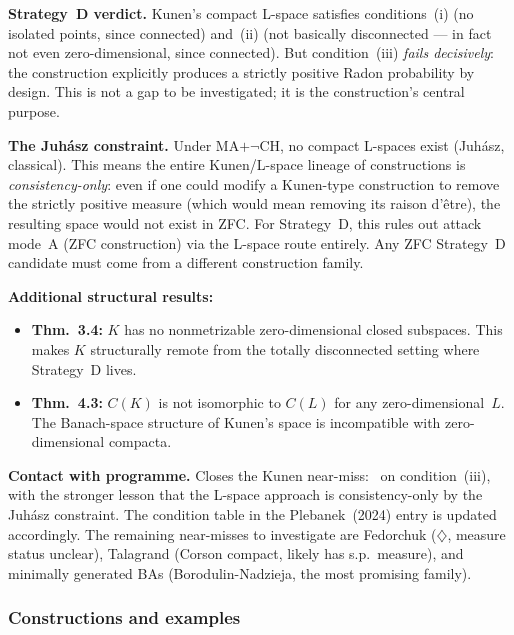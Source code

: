 \medskip\noindent
\textbf{Strategy~D verdict.}  Kunen's compact L-space satisfies
conditions~(i) (no isolated points, since connected) and~(ii) (not
basically disconnected --- in fact not even zero-dimensional, since
connected).  But condition~(iii) \emph{fails decisively}: the
construction explicitly produces a strictly positive Radon probability
by design.  This is not a gap to be investigated; it is the
construction's central purpose.

\medskip\noindent
\textbf{The Juh\'{a}sz constraint.}  Under MA$+\neg$CH, no compact
L-spaces exist (Juh\'{a}sz, classical).  This means the entire
Kunen/L-space lineage of constructions is \emph{consistency-only}:
even if one could modify a Kunen-type construction to remove the
strictly positive measure (which would mean removing its raison
d'\^{e}tre), the resulting space would not exist in ZFC\@.  For
Strategy~D, this rules out attack mode~A (ZFC construction) via the
L-space route entirely.  Any ZFC Strategy~D candidate must come from
a different construction family.

\medskip\noindent
\textbf{Additional structural results:}
\begin{itemize}[nosep]
  \item \textbf{Thm.~3.4:} $K$ has no nonmetrizable zero-dimensional
    closed subspaces.  This makes $K$ structurally remote from the
    totally disconnected setting where Strategy~D lives.
  \item \textbf{Thm.~4.3:} $C(K)$ is not isomorphic to $C(L)$ for
    any zero-dimensional~$L$.  The Banach-space structure of Kunen's
    space is incompatible with zero-dimensional compacta.
\end{itemize}

\medskip\noindent
\textbf{Contact with programme.}  Closes the Kunen near-miss:
\texttimes\ on condition~(iii), with the stronger lesson that the
L-space approach is consistency-only by the Juh\'{a}sz constraint.
The condition table in the Plebanek~(2024) entry is updated
accordingly.  The remaining near-misses to investigate are Fedorchuk
($\diamondsuit$, measure status unclear), Talagrand (Corson compact,
likely has s.p.\ measure), and minimally generated BAs
(Borodulin-Nadzieja, the most promising family).

\subsubsection{Constructions and examples}

